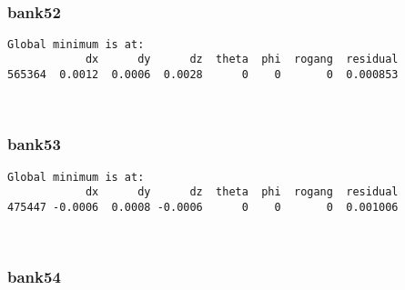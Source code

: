 \documentclass[11pt]{article}
\begin{document}
    \begin{center}
    \end{center}
    { \hspace*{\fill} \\}
    
    \hypertarget{bank52}{%
\subsubsection{bank52}\label{bank52}}

    \begin{Verbatim}[commandchars=\\\{\}]
Global minimum is at:
            dx      dy      dz  theta  phi  rogang  residual
565364  0.0012  0.0006  0.0028      0    0       0  0.000853
    \end{Verbatim}

    \begin{center}
    \end{center}
    { \hspace*{\fill} \\}
    
    \hypertarget{bank53}{%
\subsubsection{bank53}\label{bank53}}

    \begin{Verbatim}[commandchars=\\\{\}]
Global minimum is at:
            dx      dy      dz  theta  phi  rogang  residual
475447 -0.0006  0.0008 -0.0006      0    0       0  0.001006
    \end{Verbatim}

    \begin{center}
    \end{center}
    { \hspace*{\fill} \\}
    
    \hypertarget{bank54}{%
\subsubsection{bank54}\label{bank54}}
\end{document}
